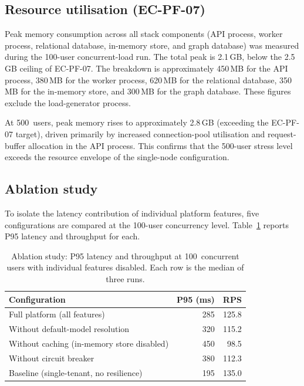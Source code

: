 \documentclass[a4paper,noexaminfo]{sapthesis}
\begin{document}
\subsection{Resource utilisation (EC-PF-07)}

Peak memory consumption across all stack components (API process, worker
process, relational database, in-memory store, and graph database) was
measured during the 100-user concurrent-load run.  The total peak is
2.1\,GB, below the 2.5\,GB ceiling of EC-PF-07.  The breakdown is
approximately 450\,MB for the API process, 380\,MB for the worker
process, 620\,MB for the relational database, 350\,MB for the in-memory
store, and 300\,MB for the graph database.  These figures exclude the
load-generator process.

At 500~users, peak memory rises to approximately 2.8\,GB (exceeding the
EC-PF-07 target), driven primarily by increased connection-pool
utilisation and request-buffer allocation in the API process.  This
confirms that the 500-user stress level exceeds the resource envelope
of the single-node configuration.

\subsection{Ablation study}

To isolate the latency contribution of individual platform features,
five configurations are compared at the 100-user concurrency level.
Table~\ref{tab:ablation} reports P95 latency and throughput for each.

\begin{table}[ht]
\centering
\caption{Ablation study: P95 latency and throughput at 100~concurrent
users with individual features disabled.  Each row is the median of
three runs.}
\label{tab:ablation}
\small
\begin{tabular}{lrr}
    \hline
    \textbf{Configuration} & \textbf{P95 (ms)} & \textbf{RPS} \\
    \hline
    Full platform (all features) & 285 & 125.8 \\
    Without default-model resolution & 320 & 115.2 \\
    Without caching (in-memory store disabled) & 450 & 98.5 \\
    Without circuit breaker & 380 & 112.3 \\
    Baseline (single-tenant, no resilience) & 195 & 135.0 \\
    \hline
\end{tabular}
\end{table}
\end{document}
